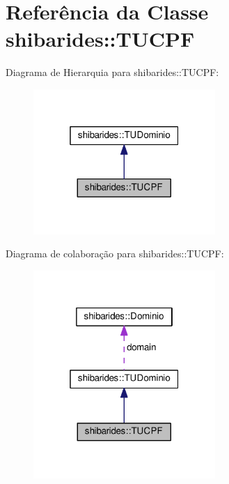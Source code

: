 \hypertarget{classshibarides_1_1TUCPF}{}\section{Referência da Classe shibarides\+:\+:T\+U\+C\+PF}
\label{classshibarides_1_1TUCPF}


Diagrama de Hierarquia para shibarides\+:\+:T\+U\+C\+PF\+:\nopagebreak
\begin{figure}[H]
\begin{center}
\leavevmode
\includegraphics[width=196pt]{classshibarides_1_1TUCPF__inherit__graph}
\end{center}
\end{figure}


Diagrama de colaboração para shibarides\+:\+:T\+U\+C\+PF\+:\nopagebreak
\begin{figure}[H]
\begin{center}
\leavevmode
\includegraphics[width=196pt]{classshibarides_1_1TUCPF__coll__graph}
\end{center}
\end{figure}
